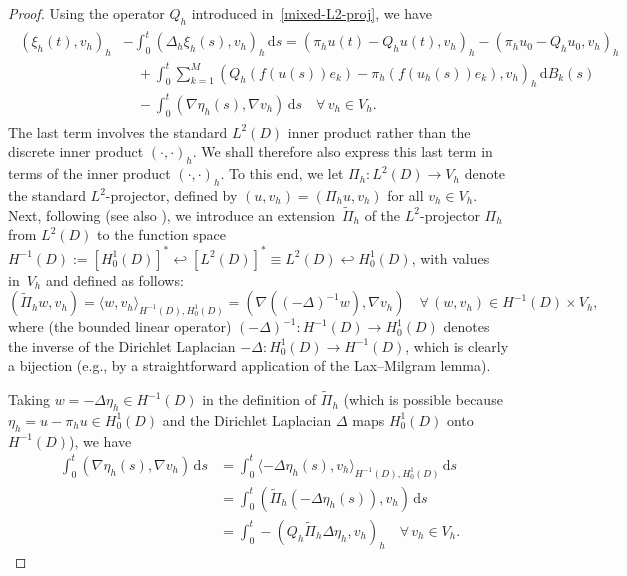 \documentclass[12pt]{article}
\newcommand{\dd}{\,\mathrm{d}}
\begin{document}
{\begin{proof}
Using the operator $Q_h$ introduced in~\eqref{mixed-L2-proj},  we have
\begin{align}\label{eq:xih}
\begin{aligned}
     ( \xi_h(t), v_h)_h &- \int_0^t (\Delta_h \xi_h(s), v_h)_h  \dd s = (\pi_h u(t) - Q_h u(t), v_h)_h - ( \pi_h u_0-Q_h u_0,v_h )_h \\
    &\quad + \int_0^t \sum_{k=1}^M (Q_h(f(u(s))e_k) - \pi_h(f(u_h(s))e_k), v_h)_h  \dd B_k(s) \\
     &\quad - \int_0^t (\nabla \eta_h(s), \nabla v_h) \dd s\quad \forall\,  v_h \in V_h.
\end{aligned}
\end{align}
%
The last term involves the standard $L^2(D)$ inner product rather than the discrete inner product $(\cdot,\cdot)_h$. We shall therefore also express this last term in terms of the inner product $(\cdot,\cdot)_h$.
To this end, we let $\Pi_h: L^2(D) \to V_h$ denote the standard $L^2$-projector, defined by $(u,v_h) = (\Pi_h u, v_h)$
for all $v_h \in V_h$. 
Next, following \cite{MR1921920} (see also \cite{MR3154916}), we introduce an extension~$ \tilde{\Pi}_h$ of the $L^2$-projector $\Pi_h$ from $L^2(D)$ to the function space $H^{-1}(D):=[H^1_0(D)]^* \hookleftarrow [L^2(D)]^* \equiv L^2(D)\hookleftarrow H^1_0(D)$,  with values in~$V_h$ and defined as follows: 
%
\begin{equation*}
(\tilde{\Pi}_h w, v_h) = \langle w,v_h\rangle_{H^{-1}(D),H^1_0(D)} = (\nabla((-\Delta)^{-1}w),\nabla v_h) \quad \forall\,  (w,v_h) \in H^{-1}(D) \times V_h, 
\end{equation*}
%
where (the bounded linear operator) $(-\Delta)^{-1}: H^{-1}(D) \to H^1_0(D)$  denotes the inverse of the Dirichlet Laplacian $-\Delta: H^1_0(D) \to H^{-1}(D)$, which is clearly a bijection (e.g., by a straightforward application of the Lax--Milgram lemma). 


Taking $w = -\Delta \eta_h \in H^{-1}(D)$ in the definition of $\tilde{\Pi}_h$ (which is possible because $\eta_h = u - \pi_h u \in H^1_0(D)$ and the Dirichlet Laplacian $\Delta$ maps $H^1_0(D)$ onto $H^{-1}(D)$), we have
%
\begin{align*}
     \int_0^t (\nabla \eta_h(s), \nabla v_h) \dd s &=  \int_0^t \langle - \Delta \eta_h(s), v_h \rangle_{H^{-1}(D), H^1_0(D)} \dd s \\
     &=  \int_0^t ( \tilde{\Pi}_h (-\Delta \eta_h(s)), v_h) \dd s \\
     &=  \int_0^t - (Q_h \tilde{\Pi}_h \Delta \eta_h, v_h)_h\quad \forall\,  v_h \in V_h.
\end{align*}
%


\end{proof}}
\end{document}
